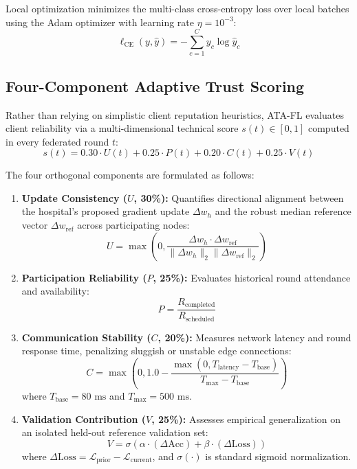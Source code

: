\documentclass[conference]{IEEEtran}
\begin{document}
Local optimization minimizes the multi-class cross-entropy loss over local batches using the Adam optimizer with learning rate $\eta = 10^{-3}$:
\begin{equation}
\ell_{\text{CE}}(y, \hat{y}) = -\sum_{c=1}^C y_c \log \hat{y}_c
\end{equation}

\subsection{Four-Component Adaptive Trust Scoring}
Rather than relying on simplistic client reputation heuristics, ATA-FL evaluates client reliability via a multi-dimensional technical score $s(t) \in [0, 1]$ computed in every federated round $t$:
\begin{equation}
s(t) = 0.30 \cdot U(t) + 0.25 \cdot P(t) + 0.20 \cdot C(t) + 0.25 \cdot V(t)
\end{equation}

The four orthogonal components are formulated as follows:
\begin{enumerate}
    \item \textbf{Update Consistency ($U$, 30\%):} Quantifies directional alignment between the hospital's proposed gradient update $\Delta w_h$ and the robust median reference vector $\Delta w_{\text{ref}}$ across participating nodes:
    \begin{equation}
    U = \max \left(0, \frac{\Delta w_h \cdot \Delta w_{\text{ref}}}{\|\Delta w_h\|_2 \|\Delta w_{\text{ref}}\|_2}\right)
    \end{equation}
    \item \textbf{Participation Reliability ($P$, 25\%):} Evaluates historical round attendance and availability:
    \begin{equation}
    P = \frac{R_{\text{completed}}}{R_{\text{scheduled}}}
    \end{equation}
    \item \textbf{Communication Stability ($C$, 20\%):} Measures network latency and round response time, penalizing sluggish or unstable edge connections:
    \begin{equation}
    C = \max \left(0, 1.0 - \frac{\max(0, T_{\text{latency}} - T_{\text{base}})}{T_{\text{max}} - T_{\text{base}}}\right)
    \end{equation}
    where $T_{\text{base}} = 80\text{ ms}$ and $T_{\text{max}} = 500\text{ ms}$.
    \item \textbf{Validation Contribution ($V$, 25\%):} Assesses empirical generalization on an isolated held-out reference validation set:
    \begin{equation}
    V = \sigma \left( \alpha \cdot (\Delta \text{Acc}) + \beta \cdot (\Delta \text{Loss}) \right)
    \end{equation}
    where $\Delta \text{Loss} = \mathcal{L}_{\text{prior}} - \mathcal{L}_{\text{current}}$, and $\sigma(\cdot)$ is standard sigmoid normalization.
\end{enumerate}
\end{document}
